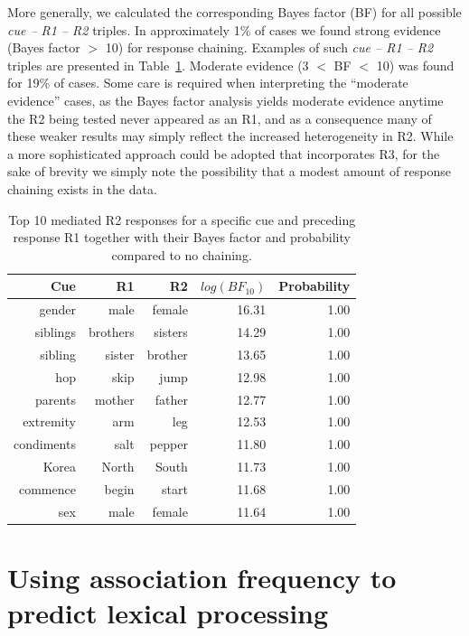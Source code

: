\documentclass[a4paper,doc,natbib,floatsintext]{apa6}
\newcommand{\stim}[1]{\textsl{#1}}
\begin{document}
More generally, we calculated the corresponding Bayes factor (BF) for all possible \stim{cue -- R1 -- R2} triples. In approximately 1\% of cases we found strong evidence (Bayes factor $>$ 10) for response chaining. Examples of such \stim{cue -- R1 -- R2} triples are presented in Table~\ref{Table:chainingExamples}.  Moderate evidence (3 $<$ BF $<$ 10) was found for 19\% of cases. Some care is required when interpreting the ``moderate evidence'' cases, as the Bayes factor analysis yields moderate evidence anytime the R2 being tested never appeared as an R1, and as a consequence many of these weaker results may simply reflect the  increased heterogeneity in R2. While a more sophisticated approach could be adopted that incorporates R3, for the sake of brevity we simply note the possibility that a modest amount of response chaining exists in the data.

\begin{table}[t]
  \centering
  \caption{Top 10 mediated R2 responses for a specific cue and preceding response R1 together
  			with their Bayes factor and probability compared to no chaining.}
  \label{Table:chainingExamples}
  \begin{tabular}{rrrrr}
  \toprule
  	Cue & R1 & R2 & $log(BF_{10})$ & Probability \\
  \midrule
    gender    			& male     		& female   		& 16.31    	& 1.00 \\
    siblings    		& brothers 		& sisters   	& 14.29    	& 1.00 \\
    sibling 			& sister 		& brother 		& 13.65 	& 1.00 \\
    hop          		& skip 			& jump 			& 12.98 	& 1.00 \\
    parents 			& mother 		& father 		& 12.77 	& 1.00 \\
	extremity   		& arm 			& leg   		& 12.53    	& 1.00 \\
	condiments 			& salt 			& pepper 		& 11.80 	& 1.00 \\
	Korea 				& North 		& South 		& 11.73 	& 1.00 \\
	commence	 		& begin 		& start 		& 11.68 	& 1.00 \\
    sex					& male 			& female 		& 11.64 	& 1.00 \\

\bottomrule
  \end{tabular}
\end{table}

\section{Using association frequency to predict lexical processing}
\end{document}
